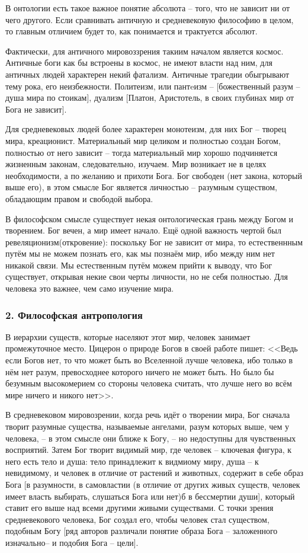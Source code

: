 \documentclass[a4paper, 12pt]{book} %
\begin{document}
В онтологии есть такое важное понятие абсолюта -- того, что не зависит ни от чего другого. Если сравнивать античную и средневековую философию в целом, то главным отличием будет то, как понимается и трактуется абсолют.

Фактически, для античного мировоззрения такиим началом является космос. Античные боги как бы встроены в космос, не имеют власти над ним, для античных людей характерен некий фатализм. Античные трагедии обыгрывают тему рока, его неизбежности. Политеизм, или пантeизм -- [божественный разум -- душа мира по стоикам], дуализм [Платон, Аристотель, в своих глубинах мир от Бога не зависит].

Для средневековых людей более характерен монотеизм, для них Бог -- творец мира, креационист. Материальный мир целиком и полностью создан Богом, полностью от него зависит -- тогда материальный мир хорошо подчиняется жизненным законам, следовательно, изучаем. Мир возникает не в целях необходимости, а по желанию и прихоти Бога. Бог свободен (нет закона, который выше его), в этом смысле Бог является личностью -- разумным существом, обладающим правом и свободой выбора.

В философском смысле существует некая онтологическая грань между Богом и творением. Бог вечен, а мир имеет начало. 
Ещё одной важность чертой был ревеляционизм(откровение): поскольку Бог не зависит от мира, то естественнным путём мы не можем познать его, как мы познаём мир, ибо между ним нет никакой связи. Мы естественным путём можем прийти к выводу, что Бог существует, открывая некие свои черты личности, но не себя полностью. Для человека это важнее, чем само изучение мира. 
 
 
\subsubsection*{2. Философская антропология}
В иерархии существ, которые населяют этот мир, человек занимает промежуточное место. Цицерон о природе Богов в своей работе пишет: <<Ведь если Богов нет, то что может быть во Вселенной лучше человека, ибо только в нём нет разум, превосходнее которого ничего не может быть. Но было бы безумным высокомерием со стороны человека считать, что лучше него во всём мире ничего и никого нет>>. 

В средневековом мировозрении, когда речь идёт о творении мира, Бог сначала творит разумные существа, называемые ангелами, разум которых выше, чем у человека, --  в этом смысле они ближе к Богу, -- но недоступны для чувственных восприятий. Затем Бог творит видимый мир, где человек -- ключевая фигура, к него есть тело и душа: тело принадлежит к видмиому миру, душа -- к невидимому, и человек в отличие от растений и животных, содержит в себе образ Бога [в разумности, в самовластии (в отличие от других живых существ, человек имеет власть выбирать, слушаться Бога или нет)б в бессмертии души], который ставит его выше над всеми другими живыми существами. С точки зрения средневекового человека, Бог создал его, чтобы человек стал существом, подобным Богу [ряд авторов различали понятие образа Бога -- заложенного изначально-- и подобия Бога -- цели]. 
\end{document}
